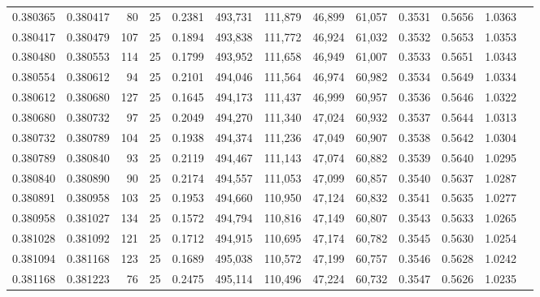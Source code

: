 \begin{tabular}{rrrrrrrrrrrrr}
0.380365 & 0.380417 &    80 &  25 &                                     0.2381 & 493,731 & 111,879 &  46,899 &  61,057 & 0.3531 & 0.5656 & 1.0363 \\
0.380417 & 0.380479 &   107 &  25 &                                     0.1894 & 493,838 & 111,772 &  46,924 &  61,032 & 0.3532 & 0.5653 & 1.0353 \\
0.380480 & 0.380553 &   114 &  25 &                                     0.1799 & 493,952 & 111,658 &  46,949 &  61,007 & 0.3533 & 0.5651 & 1.0343 \\
0.380554 & 0.380612 &    94 &  25 &                                     0.2101 & 494,046 & 111,564 &  46,974 &  60,982 & 0.3534 & 0.5649 & 1.0334 \\
0.380612 & 0.380680 &   127 &  25 &                                     0.1645 & 494,173 & 111,437 &  46,999 &  60,957 & 0.3536 & 0.5646 & 1.0322 \\
0.380680 & 0.380732 &    97 &  25 &                                     0.2049 & 494,270 & 111,340 &  47,024 &  60,932 & 0.3537 & 0.5644 & 1.0313 \\
0.380732 & 0.380789 &   104 &  25 &                                     0.1938 & 494,374 & 111,236 &  47,049 &  60,907 & 0.3538 & 0.5642 & 1.0304 \\
0.380789 & 0.380840 &    93 &  25 &                                     0.2119 & 494,467 & 111,143 &  47,074 &  60,882 & 0.3539 & 0.5640 & 1.0295 \\
0.380840 & 0.380890 &    90 &  25 &                                     0.2174 & 494,557 & 111,053 &  47,099 &  60,857 & 0.3540 & 0.5637 & 1.0287 \\
0.380891 & 0.380958 &   103 &  25 &                                     0.1953 & 494,660 & 110,950 &  47,124 &  60,832 & 0.3541 & 0.5635 & 1.0277 \\
0.380958 & 0.381027 &   134 &  25 &                                     0.1572 & 494,794 & 110,816 &  47,149 &  60,807 & 0.3543 & 0.5633 & 1.0265 \\
0.381028 & 0.381092 &   121 &  25 &                                     0.1712 & 494,915 & 110,695 &  47,174 &  60,782 & 0.3545 & 0.5630 & 1.0254 \\
0.381094 & 0.381168 &   123 &  25 &                                     0.1689 & 495,038 & 110,572 &  47,199 &  60,757 & 0.3546 & 0.5628 & 1.0242 \\
0.381168 & 0.381223 &    76 &  25 &                                     0.2475 & 495,114 & 110,496 &  47,224 &  60,732 & 0.3547 & 0.5626 & 1.0235 \\

\end{tabular}
